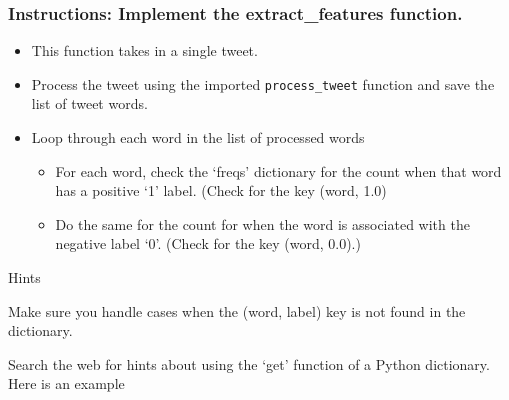 \documentclass[11pt]{article}
\providecommand{\tightlist}{%
      \setlength{\itemsep}{0pt}\setlength{\parskip}{0pt}}
\begin{document}
\hypertarget{instructions-implement-the-extract_features-function.}{%
\subsubsection{Instructions: Implement the extract\_features
function.}\label{instructions-implement-the-extract_features-function.}}

\begin{itemize}
\tightlist
\item
  This function takes in a single tweet.
\item
  Process the tweet using the imported \texttt{process\_tweet} function
  and save the list of tweet words.
\item
  Loop through each word in the list of processed words

  \begin{itemize}
  \tightlist
  \item
    For each word, check the `freqs' dictionary for the count when that
    word has a positive `1' label. (Check for the key (word, 1.0)
  \item
    Do the same for the count for when the word is associated with the
    negative label `0'. (Check for the key (word, 0.0).)
  \end{itemize}
\end{itemize}

    Hints

Make sure you handle cases when the (word, label) key is not found in
the dictionary.

Search the web for hints about using the `get' function of a Python
dictionary. Here is an example
\end{document}
